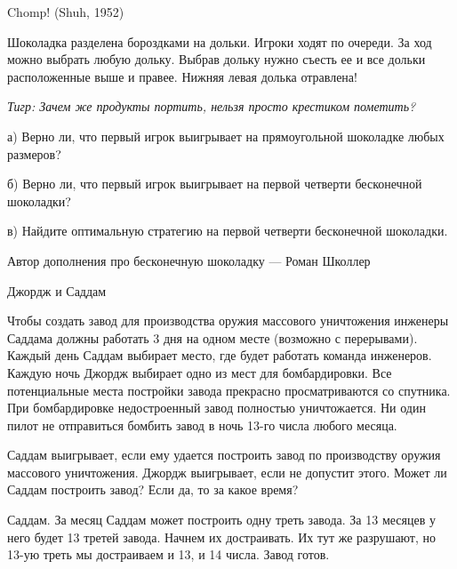 \begin{problem}
 Chomp! (Shuh, 1952)\par
Шоколадка разделена бороздками на дольки. Игроки ходят по очереди. За ход можно выбрать любую дольку. Выбрав дольку нужно съесть ее и все дольки расположенные выше и правее. Нижняя левая долька отравлена!\par
{\it Тигр: Зачем же продукты портить, нельзя просто крестиком пометить?}\par
а)	Верно ли, что первый игрок выигрывает на прямоугольной шоколадке любых размеров?\par
б)	Верно ли, что первый игрок выигрывает на первой четверти бесконечной шоколадки?\par
в)	Найдите оптимальную стратегию на первой четверти бесконечной шоколадки.

Автор дополнения про бесконечную шоколадку — Роман Школлер



\begin{sol}

\end{sol}
\end{problem}




\begin{problem}
 Джордж и Саддам\par
Чтобы создать завод для производства оружия массового уничтожения инженеры Саддама должны работать 3 дня на одном месте (возможно с перерывами). Каждый день Саддам выбирает место, где будет работать команда инженеров. Каждую ночь Джордж выбирает одно из мест для бомбардировки. Все потенциальные места постройки завода прекрасно просматриваются со спутника. При бомбардировке недостроенный завод полностью уничтожается. Ни один пилот не отправиться бомбить завод в ночь 13-го числа любого месяца. %

Саддам выигрывает, если ему удается построить завод по производству оружия массового уничтожения. Джордж выигрывает, если не допустит этого. Может ли Саддам построить завод? Если да, то за какое время?



\begin{sol}
Саддам. За месяц Саддам может построить одну треть завода. За 13 месяцев у него будет 13 третей завода. Начнем их достраивать. Их тут же разрушают, но 13-ую треть мы достраиваем и 13, и 14 числа. Завод готов.
\end{sol}
\end{problem}



